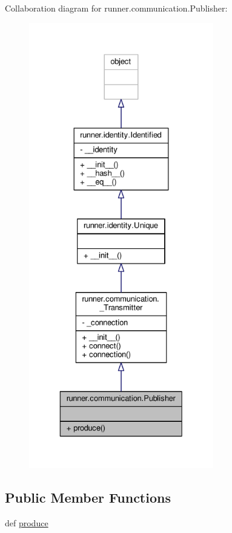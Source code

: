 Collaboration diagram for runner.\+communication.\+Publisher\+:
\nopagebreak
\begin{figure}[H]
\begin{center}
\leavevmode
\includegraphics[height=550pt]{classrunner_1_1communication_1_1Publisher__coll__graph}
\end{center}
\end{figure}
\subsection*{Public Member Functions}
\begin{DoxyCompactItemize}
\item 
def \hyperlink{classrunner_1_1communication_1_1Publisher_a5428c27894232f2e285b85ee32f03860}{produce}
\end{DoxyCompactItemize}



